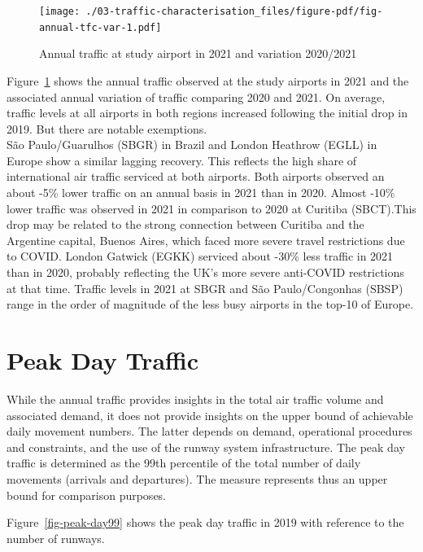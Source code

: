 \documentclass[
  a4paper,
  DIV=11,
  numbers=noendperiod]{scrreprt}
\begin{document}
\begin{figure}[h]

{\centering \texttt{[image: ./03-traffic-characterisation\_files/figure-pdf/fig-annual-tfc-var-1.pdf]}

}

\caption{\label{fig-annual-tfc-var}Annual traffic at study airport in
2021 and variation 2020/2021}

\end{figure}

Figure~\ref{fig-annual-tfc-var} shows the annual traffic observed at the
study airports in 2021 and the associated annual variation of traffic
comparing 2020 and 2021. On average, traffic levels at all airports in
both regions increased following the initial drop in 2019. But there are
notable exemptions.\\
São Paulo/Guarulhos (SBGR) in Brazil and London Heathrow (EGLL) in
Europe show a similar lagging recovery. This reflects the high share of
international air traffic serviced at both airports. Both airports
observed an about -5\% lower traffic on an annual basis in 2021 than in
2020. Almost -10\% lower traffic was observed in 2021 in comparison to
2020 at Curitiba (SBCT).This drop may be related to the strong
connection between Curitiba and the Argentine capital, Buenos Aires,
which faced more severe travel restrictions due to COVID. London Gatwick
(EGKK) serviced about -30\% less traffic in 2021 than in 2020, probably
reflecting the UK's more severe anti-COVID restrictions at that time.
Traffic levels in 2021 at SBGR and São Paulo/Congonhas (SBSP) range in
the order of magnitude of the less busy airports in the top-10 of
Europe.

\hypertarget{peak-day-traffic}{%
\section{Peak Day Traffic}\label{peak-day-traffic}}

While the annual traffic provides insights in the total air traffic
volume and associated demand, it does not provide insights on the upper
bound of achievable daily movement numbers. The latter depends on
demand, operational procedures and constraints, and the use of the
runway system infrastructure. The peak day traffic is determined as the
99th percentile of the total number of daily movements (arrivals and
departures). The measure represents thus an upper bound for comparison
purposes.

Figure~\ref{fig-peak-day99} shows the peak day traffic in 2019 with
reference to the number of runways.
\end{document}
